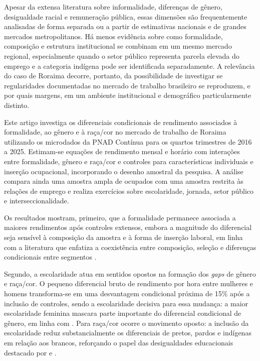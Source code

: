 \documentclass[12pt,a4paper]{article}
\begin{document}
Apesar da extensa literatura sobre informalidade, diferenças de gênero, desigualdade
racial e remuneração pública, essas dimensões são frequentemente analisadas de forma
separada ou a partir de estimativas nacionais e de grandes mercados metropolitanos. Há
menos evidência sobre como formalidade, composição e estrutura institucional se combinam
em um mesmo mercado regional, especialmente quando o setor público representa parcela
elevada do emprego e a categoria indígena pode ser identificada separadamente. A
relevância do caso de Roraima decorre, portanto, da possibilidade de investigar se
regularidades documentadas no mercado de trabalho brasileiro se reproduzem, e por quais
margens, em um ambiente institucional e demográfico particularmente distinto.

Este artigo investiga os diferenciais condicionais de rendimento associados à formalidade,
ao gênero e à raça/cor no mercado de trabalho de Roraima utilizando os microdados da PNAD
Contínua para os quartos trimestres de 2016 a 2025. Estimam-se equações de rendimento
mensal e horário com interações entre formalidade, gênero e raça/cor e controles para
características individuais e inserção ocupacional, incorporando o desenho amostral da
pesquisa. A análise compara ainda uma amostra ampla de ocupados com uma amostra restrita
às relações de emprego e realiza exercícios sobre escolaridade, jornada, setor público e
interseccionalidade.

Os resultados mostram, primeiro, que a formalidade permanece associada a maiores
rendimentos após controles extensos, embora a magnitude do diferencial seja sensível à
composição da amostra e à forma de inserção laboral, em linha com a literatura que
enfatiza a coexistência entre composição, seleção e diferenças condicionais entre
segmentos \citep{curi2006, meghir2015, ulyssea2018}.

Segundo, a escolaridade atua em sentidos opostos na formação dos \textit{gaps} de gênero
e raça/cor. O pequeno diferencial bruto de rendimento por hora entre mulheres e homens
transforma-se em uma desvantagem condicional próxima de 15\% após a inclusão de controles,
sendo a escolaridade decisiva para essa mudança: a maior escolaridade feminina mascara
parte importante do diferencial condicional de gênero, em linha com \citet{giuberti2005}.
Para raça/cor ocorre o movimento oposto: a inclusão da escolaridade reduz
substancialmente os diferenciais de pretos, pardos e indígenas em relação aos brancos,
reforçando o papel das desigualdades educacionais destacado por \citet{soares2000} e
\citet{campante2004}.
\end{document}
